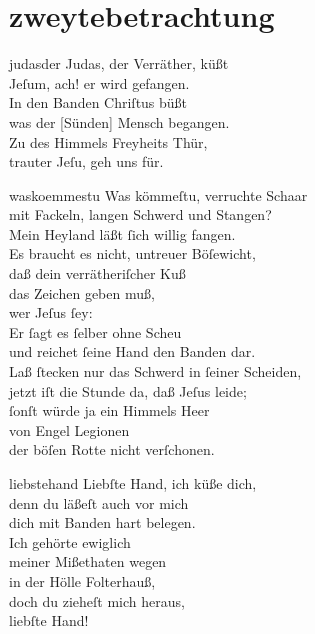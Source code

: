 \documentclass[abbrwidth=6em,tocstyle=ref-genre,shorttitlesize=50]{ees}
\begin{document}
{\clearpage
\part{zweytebetrachtung}

\begin{movement}{judasder}
  \voice[Coro]
  Judas, der Verräther, küßt\\
  Jeſum, ach! er wird gefangen.\\
  In den Banden Chriſtus büßt\\
  was der [Sünden] Mensch begangen.\\
  Zu des Himmels Freyheits Thür,\\
  trauter Jeſu, geh uns für.
\end{movement}

\begin{movement}{waskoemmestu}
  \voice[Alto]
  Was kömmeſtu, verruchte Schaar\\
  mit Fackeln, langen Schwerd und Stangen?\\
  Mein Heyland läßt ſich willig fangen.\\
  Es braucht es nicht, untreuer Böſewicht,\\
  daß dein verrätheriſcher Kuß\\
  das Zeichen geben muß,\\
  wer Jeſus ſey:\\
  Er ſagt es ſelber ohne Scheu\\
  und reichet ſeine Hand den Banden dar.\\
  Laß ſtecken nur das Schwerd in ſeiner Scheiden,\\
  jetzt iſt die Stunde da, daß Jeſus leide;\\
  ſonſt würde ja ein Himmels Heer\\
  von Engel Legionen\\
  der böſen Rotte nicht verſchonen.
\end{movement}

\begin{movement}{liebstehand}
  \voice[Alto]
  Liebſte Hand, ich küße dich,\\
  denn du läßeſt auch vor mich\\
  dich mit Banden hart belegen.\\
  Ich gehörte ewiglich\\
  meiner Mißethaten wegen\\
  in der Hölle Folterhauß,\\
  doch du zieheſt mich heraus,\\
  liebſte Hand!
\end{movement}

}
\end{document}
